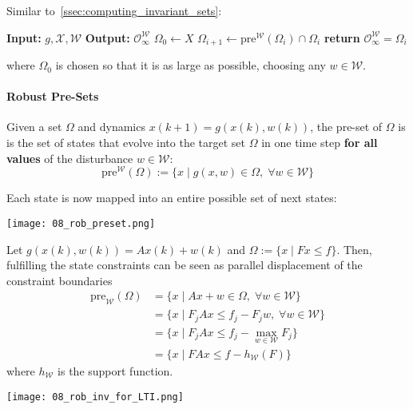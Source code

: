 \newpar{}

Similar to~\ref{ssec:computing_invariant_sets}:
\begin{algorithmic}
    \State{} \textbf{Input:} $g, \mathcal{X}, \mathcal{W}$
    \State{} \textbf{Output:} $\mathcal{O}_\infty^\mathcal{W}$
    \State{} $\Omega_0 \gets X$
    \State{} $\Omega_{i+1} \gets \text{pre}^\mathcal{W}(\Omega_i) \cap \Omega_i$
    \State{} \textbf{return} $\mathcal{O}_\infty^\mathcal{W} = \Omega_i$
    \EndIf{}
    \EndWhile{}
\end{algorithmic}
where $\Omega_0$ is chosen so that it is as large as possible, choosing any $w\in \mathcal{W}$.

\paragraph{Robust Pre-Sets}

Given a set $\Omega$ and dynamics $x(k + 1) = g(x(k), w(k))$, the pre-set of $\Omega$ is is the set of states that evolve into the target set $\Omega$ in one time step \textbf{for all values} of the disturbance $w \in \mathcal{W}$:
\begin{equation*}
    \text{pre}^{\mathcal{W}}(\Omega) := \{x \mid g(x, w) \in \Omega, \; \forall w \in \mathcal{W} \}
\end{equation*}

Each state is now mapped into an entire possible set of next states:
\begin{center}
    \texttt{[image: 08\_rob\_preset.png]}
\end{center}

\newpar{}

Let $g(x(k), w(k)) = Ax(k) + w(k)$ and $\Omega := \{x \mid Fx \leq f\}$. Then, fulfilling the state constraints can be seen as parallel displacement of the constraint boundaries
\begin{align*}
    \text{pre}_{\mathcal{W}}(\Omega) & = \{x \mid Ax + w \in \Omega, \; \forall w \in \mathcal{W} \}      \\
                                     & = \{x \mid F_j Ax \leq f_j -F_j w, \; \forall w \in \mathcal{W} \} \\
                                     & = \{x \mid F_j Ax \leq f_j -\max_{w\in \mathcal{W}} F_j\}          \\
                                     & = \{x \mid FAx \leq f - h_\mathcal{W}(F) \}
\end{align*}
where $h_\mathcal{W}$ is the support function.
\begin{center}
    \texttt{[image: 08\_rob\_inv\_for\_LTI.png]}
\end{center}

